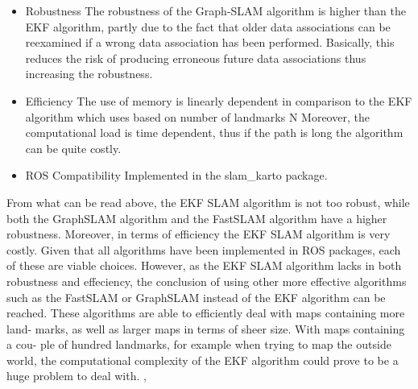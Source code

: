\begin{itemize}
\begin{itemize}
            \item Robustness
                The robustness of the Graph-SLAM algorithm is higher than the EKF algorithm, partly due to the fact that older data associations can be reexamined if a wrong data association has been performed. Basically, this reduces the risk of producing erroneous future data associations thus increasing the robustness.
            \item Efficiency
                The use of memory is linearly dependent in comparison to the EKF algorithm which uses  based on number of landmarks N Moreover, the computational load is time dependent, thus if the path is long the algorithm can be quite costly. \cite{Item-levelEnhancement}
            \item ROS Compatibility
                Implemented in the slam\_karto package.
        \end{itemize}  
\end{itemize}

From what can be read above, the EKF SLAM algorithm is not too robust, while both the GraphSLAM algorithm and the FastSLAM algorithm have a higher robustness. Moreover, in terms of efficiency the EKF SLAM algorithm is very costly. Given that all algorithms have been implemented in ROS packages, each of these are viable choices. However, as the EKF SLAM algorithm lacks in both robustness and effeciency, the conclusion of using other more effective algorithms such as the FastSLAM or GraphSLAM instead of the EKF algorithm can be reached. These algorithms are able to efficiently deal with maps containing more land- marks, as well as larger maps in terms of sheer size. With maps containing a cou- ple of hundred landmarks, for example when trying to map the outside world, the computational complexity of the EKF algorithm could prove to be a huge problem to deal with. \cite{thrun2013}, \cite{thrun2005}